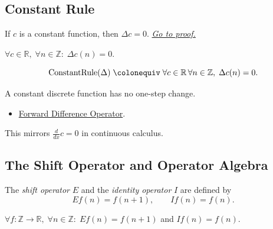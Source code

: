 \subsection*{Constant Rule}

\begin{proposition}
\label{prop:delta-constant}
If \(c\) is a constant function, then \(\Delta c = 0\).
\hyperref[prf:delta-constant]{\textit{Go to proof.}}
\end{proposition}

\begin{remark*}
\(\forall c \in \mathbb{R},\; \forall n \in \mathbb{Z}:\; \Delta c(n) = 0\).
\end{remark*}

\begin{remark*}
\[
  \operatorname{ConstantRule}(\Delta)
  \;\colonequiv\;
  \forall c\in\mathbb R\,\forall n\in\mathbb Z,\; \Delta c(n)=0.
\]
\end{remark*}

\begin{remark*}[Interpretation]
A constant discrete function has no one-step change.
\end{remark*}

\begin{dependencies}
\begin{itemize}
  \item \hyperref[def:forward-difference]{Forward Difference Operator}.
\end{itemize}
\end{dependencies}


\begin{exposition}
This mirrors \(\tfrac{d}{dx} c = 0\) in continuous calculus.
\end{exposition}

\subsection*{The Shift Operator and Operator Algebra}

\begin{definition}
\label{def:shift-operator}
The \emph{shift operator} \(E\) and the \emph{identity operator} \(I\)
are defined by
\[
Ef(n) = f(n+1), \qquad If(n) = f(n).
\]
\end{definition}

\DefinitionalRoot

\begin{remark*}
\(\forall f : \mathbb{Z}\to\mathbb{R},\; \forall n \in \mathbb{Z}:\;
Ef(n) = f(n+1)\) and \(If(n) = f(n)\).
\end{remark*}

